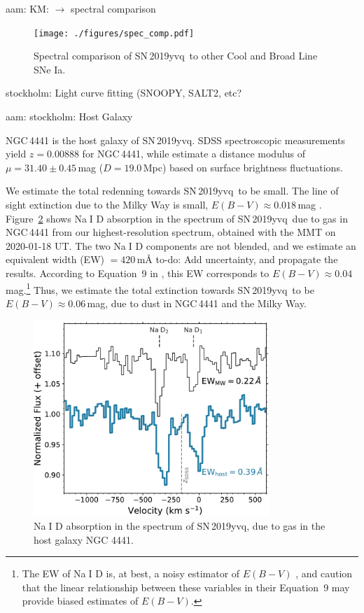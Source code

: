 \documentclass[twocolumn]{aastex63}
\def\ion#1#2{#1$\;${\footnotesize\rm{#2}}\relax}
\newcommand{\kate}[1]{{\color{red} KM: {#1}}}
\newcommand{\aam}[1]{{\color{DarkOrange} aam: {#1}}}
\newcommand{\stockholm}[1]{{\color{cyan} stockholm: {#1}}}
\newcommand{\todo}[1]{{\color{magenta} to-do: {#1}}}
\newcommand{\sn}{SN\,2019yvq}
\begin{document}
\aam{\kate{$\longrightarrow$ spectral comparison}}

\begin{figure}
    \centering
    \texttt{[image: ./figures/spec\_comp.pdf]}
    \caption{Spectral comparison of \sn\ to other Cool and Broad Line SNe Ia.}
    \label{fig:spec_comp}
\end{figure}

\stockholm{Light curve fitting (SNOOPY, SALT2, etc?}

\aam{\stockholm{Host Galaxy}}

NGC\,4441 is the host galaxy of \sn. SDSS spectroscopic measurements yield $z = 0.00888$ \citep{Abolfathi18} for NGC\,4441, while \citet{Tonry01} estimate a distance modulus of $\mu = 31.40 \pm 0.45$\,mag ($D = 19.0$\,Mpc) based on surface brightness fluctuations. 

We estimate the total redenning towards \sn\ to be small. The line of sight extinction due to the Milky Way is small, $E(B-V) \approx 0.018$\,mag \citep{Schlafly11}. Figure~\ref{fig:NaD} shows \ion{Na}{I} D absorption in the spectrum of \sn\ due to gas in NGC\,4441 from our highest-resolution spectrum, obtained with the MMT on 2020-01-18 UT. The two \ion{Na}{I} D components are not blended, and we estimate an equivalent width (EW) $= 420$\,m\AA \todo{Add uncertainty, and propagate the results}. According to Equation~9 in \citet{Poznanski12}, this EW corresponds to $E(B-V) \approx 0.04$\,mag.\footnote{The EW of \ion{Na}{I} D is, at best, a noisy estimator of $E(B-V)$ \citep{Poznanski11}, and \citet{Poznanski12} caution that the linear relationship between these variables in their Equation~9 may provide biased estimates of $E(B-V)$.} Thus, we estimate the total extinction towards \sn\ to be $E(B-V) \approx 0.06$\,mag, due to dust in NGC\,4441 and the Milky Way. 

\begin{figure}
    \centering
    \includegraphics[width=3.5in]{./figures/NaD.pdf}
    \caption{\ion{Na}{I} D absorption in the spectrum of \sn, due to gas in the host galaxy NGC 4441. }
    \label{fig:NaD}
\end{figure}
\end{document}
